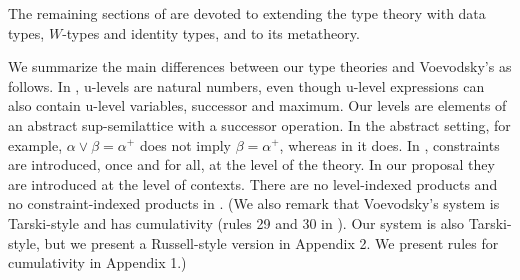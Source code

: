 \documentclass[11pt,a4paper]{article}
\theoremstyle{definition}
\begin{document}
The remaining sections of \cite{VV} are devoted to extending the
type theory with data types, $W$-types and identity types,
and to its metatheory.

We summarize the main differences between our type theories
and Voevodsky's as follows.
%
In \cite{VV}, u-levels are natural numbers, even though u-level
expressions can also contain u-level variables, successor and maximum.
Our levels are elements of an abstract sup-semilattice with a successor
operation. In the abstract setting, for example,
$\alpha\vee\beta=\alpha^+$ does not imply $\beta=\alpha^+$,
whereas in \cite{VV} it does.
%
In \cite{VV}, constraints are introduced, once and for all,
at the level of the theory. In our proposal they are introduced
at the level of contexts.
There are no level-indexed products and no constraint-indexed products in \cite{VV}.
%
%
(We also remark that Voevodsky's system is Tarski-style and has cumulativity (rules 29 and 30 in \cite[Section 3.4]{VV}). Our system is also Tarski-style, but we present a Russell-style version in Appendix 2. We present rules for cumulativity in Appendix 1.)




\end{document}

